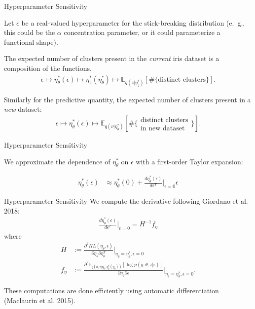 \documentclass[10pt]{beamer}\usepackage[]{graphicx}\usepackage[]{color}
\newcommand{\Expect}{\mathbb{E}}
\newcommand{\etazopt}{\eta_z^{*}}
\newcommand{\etathetaopt}{\eta_\theta^{*}}
\newcommand{\QExpect}
{\Expect_{q\left(\theta, z \vert \eta_\theta, \etazopt(\eta_\theta)\right)}}
\newcommand{\atzero}{\Big\rvert_{\eta_\theta = \etathetaopt, \epsilon = 0}}
\begin{document}
\begin{frame}{Hyperparameter Sensitivity}

Let $\epsilon$ be a real-valued hyperparameter for the stick-breaking distribution
(e.\ g., this could be the $\alpha$ concentration parameter, or it could parameterize a functional shape).

\pause

The expected number of clusters present in the {\itshape current} iris dataset is a composition of the functions,
\begin{align*}
  \epsilon \mapsto
  \etathetaopt(\epsilon) \mapsto
  \etazopt\left(\etathetaopt\right) \mapsto
  \Expect_{q(z | \etazopt)} \left[ \#\{\text{distinct clusters}\} \right].
\end{align*}

\pause

Similarly for the predictive quantity, the expected number of clusters present in a {\itshape new} dataset:
\begin{align*}
  \epsilon \mapsto
  \etathetaopt(\epsilon) \mapsto
  \Expect_{q(\nu \vert \etathetaopt)}
  \left[\#\{\substack{\text{distinct clusters}\\\text{in new dataset}}\} \right].
\end{align*}


\end{frame}

\begin{frame}{Hyperparameter Sensitivity}

We approximate the dependence of $\etathetaopt$ on $\epsilon$ with a first-order
Taylor expansion:

\begin{align*}
  \etathetaopt(\epsilon)  &\approx  \etathetaopt(0) +
  \frac{d \etathetaopt(\epsilon)}{d\epsilon^T}\Big|_{\epsilon=0} \epsilon
\end{align*}
\end{frame}


\begin{frame}{Hyperparameter Sensitivity}
We compute the derivative following Giordano et al. 2018:
\begin{align*}
\frac{d \etathetaopt(\epsilon)}{d\epsilon^T}\Big|_{\epsilon=0} = H^{-1}f_\eta
\end{align*}
where
\begin{align*}
  H &:= \frac{\partial^2 KL(\eta_\theta, \epsilon) }{
      \partial \eta_\theta \partial \eta_\theta^T}
      \atzero
\\
  f_\eta &:= \frac{\partial^2
      \QExpect \left[ \log p\left(y, \theta, z \vert \epsilon \right) \right]}{\partial \eta_\theta \partial \epsilon}
      \atzero.
\end{align*}

These computations are done efficiently using automatic differentiation (Maclaurin et al. 2015). 

\end{frame}
\end{document}
